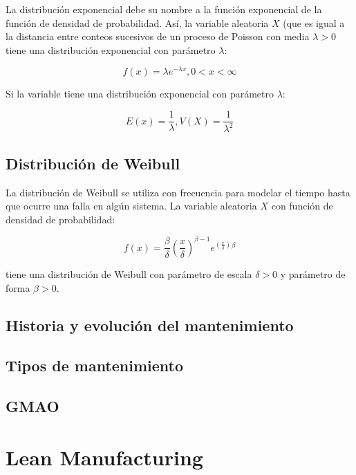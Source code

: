 La distribución exponencial debe su nombre a la función exponencial de la función de densidad de probabilidad. Así, la variable aleatoria $X$ (que es igual a la distancia entre conteos sucesivos de un proceso de Poisson con media $\lambda>0$ tiene una distribución exponencial con parámetro $\lambda$:

\begin{equation*}
f(x)=\lambda e^{-\lambda x}, 0<x<\infty
\end{equation*}

Si la variable tiene una distribución exponencial con parámetro $\lambda$:

\begin{equation*}
E(x)=\frac{1}{\lambda}, V(X)=\frac{1}{\lambda^2}
\end{equation*}

\subsection{Distribución de Weibull}

La distribución de Weibull se utiliza con frecuencia para modelar el tiempo hasta que ocurre una falla en algún sistema. La variable aleatoria $X$ con función de densidad de probabilidad:

\begin{equation*}
f(x)=\frac{\beta}{\delta}\left( \frac{x}{\delta} \right)^{\beta-1}e^{\left( \frac{x}{\delta} \right)}{}^\beta
\end{equation*}

tiene una distribución de Weibull con parámetro de escala $\delta>0$ y parámetro de forma $\beta>0$.



\subsection{Historia y evolución del mantenimiento}

\subsection{Tipos de mantenimiento}

\subsection{GMAO}

\section{Lean Manufacturing}

